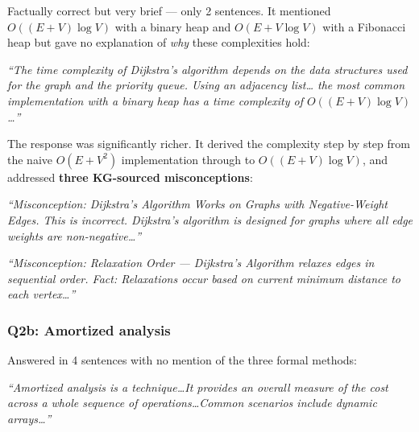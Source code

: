 \documentclass[12pt,a4paper]{article}
\newenvironment{ragbox}[1]{%
  \begin{tcolorbox}[
    title={\textbf{#1}},
    colback=ragbg,
    colframe=ragborder,
    colbacktitle=ragborder,
    coltitle=white,
    left=6pt, right=6pt, top=4pt, bottom=4pt,
    boxrule=0.5pt,
    arc=3pt,
    fonttitle=\small\bfseries,
    breakable,
  ]
  \small
}{%
  \end{tcolorbox}
}
\newenvironment{plainbox}[1]{%
  \begin{tcolorbox}[
    title={\textbf{#1}},
    colback=plainbg,
    colframe=plainborder,
    colbacktitle=plainborder,
    coltitle=white,
    left=6pt, right=6pt, top=4pt, bottom=4pt,
    boxrule=0.5pt,
    arc=3pt,
    fonttitle=\small\bfseries,
    breakable,
  ]
  \small
}{%
  \end{tcolorbox}
}
\begin{document}
\begin{plainbox}{WITHOUT RAG --- Charlie (Intermediate)}
Factually correct but very brief --- only 2 sentences. It mentioned
$O((E+V)\log V)$ with a binary heap and $O(E + V\log V)$ with a Fibonacci heap
but gave no explanation of \textit{why} these complexities hold:

\medskip
\textit{``The time complexity of Dijkstra's algorithm depends on the data
structures used for the graph and the priority queue. Using an adjacency list\ldots
the most common implementation with a binary heap has a time complexity of
$O((E+V)\log V)$\ldots''}
\end{plainbox}

\begin{ragbox}{WITH RAG --- Charlie (Intermediate)}
The response was significantly richer. It derived the complexity step by step
from the naive $O(E + V^2)$ implementation through to $O((E+V)\log V)$, and
addressed \textbf{three KG-sourced misconceptions}:

\medskip
\textit{``Misconception: Dijkstra's Algorithm Works on Graphs with
Negative-Weight Edges. This is incorrect. Dijkstra's algorithm is designed for
graphs where all edge weights are non-negative\ldots''}

\medskip
\textit{``Misconception: Relaxation Order --- Dijkstra's Algorithm relaxes
edges in sequential order. Fact: Relaxations occur based on current minimum
distance to each vertex\ldots''}
\end{ragbox}

\subsubsection{Q2b: Amortized analysis}

\begin{plainbox}{WITHOUT RAG --- Charlie}
Answered in 4 sentences with no mention of the three formal methods:

\medskip
\textit{``Amortized analysis is a technique\ldots It provides an overall measure
of the cost across a whole sequence of operations\ldots Common scenarios include
dynamic arrays\ldots''}
\end{plainbox}
\end{document}
